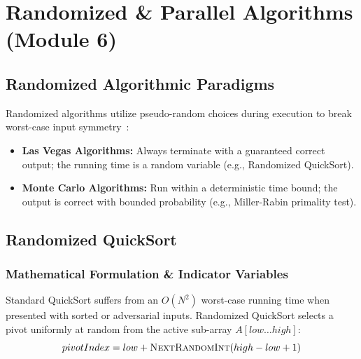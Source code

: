 \chapter{Randomized \& Parallel Algorithms (Module 6)}
\label{ch:parallel_randomized}

\section{Randomized Algorithmic Paradigms}
Randomized algorithms utilize pseudo-random choices during execution to break worst-case input symmetry~\cite{clrs2009}:
\begin{itemize}
    \item \textbf{Las Vegas Algorithms:} Always terminate with a guaranteed correct output; the running time is a random variable (e.g., Randomized QuickSort).
    \item \textbf{Monte Carlo Algorithms:} Run within a deterministic time bound; the output is correct with bounded probability (e.g., Miller-Rabin primality test).
\end{itemize}

\section{Randomized QuickSort}
\subsection{Mathematical Formulation \& Indicator Variables}
Standard QuickSort suffers from an $O(N^2)$ worst-case running time when presented with sorted or adversarial inputs. Randomized QuickSort selects a pivot uniformly at random from the active sub-array $A[low \dots high]$:
\begin{equation}
pivotIndex = low + \Call{NextRandomInt}{high - low + 1}
\end{equation}

